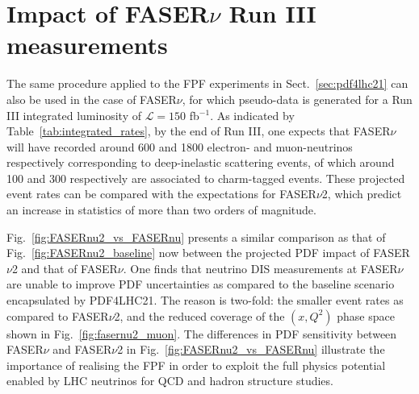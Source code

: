 \section{Impact of FASER$\nu$ Run III measurements}
\label{app:fasernu_runIII_impact}

The same procedure applied to the FPF experiments in Sect.~\ref{sec:pdf4lhc21}
can also be used in the case of FASER$\nu$, for which pseudo-data is generated
for a Run III integrated
luminosity of $\mathcal{L}=150$ fb$^{-1}$.
%
As indicated by Table~\ref{tab:integrated_rates}, by the end of Run III, one expects
that FASER$\nu$ will have recorded around 600 and 1800 electron- and muon-neutrinos
respectively corresponding to deep-inelastic scattering events, of which around 100
and 300 respectively are associated to charm-tagged events.
%
These projected event rates can be compared with the expectations for FASER$\nu$2, which predict
an increase in statistics of more than two orders of magnitude.

Fig.~\ref{fig:FASERnu2_vs_FASERnu} presents a similar comparison as that of
Fig.~\ref{fig:FASERnu2_baseline} now between the projected PDF impact of FASER$\nu$2 and that of
FASER$\nu$.
%
One finds that neutrino DIS measurements at FASER$\nu$ are unable to improve
PDF uncertainties as compared to the baseline scenario encapsulated by PDF4LHC21.
%
The reason is two-fold: the smaller event rates as compared to FASER$\nu$2,
and the reduced coverage of the $(x,Q^2)$ phase space shown in Fig.~\ref{fig:fasernu2_muon}.
%
The differences in PDF sensitivity between FASER$\nu$ and FASER$\nu$2 in
Fig.~\ref{fig:FASERnu2_vs_FASERnu} illustrate
the  importance of realising the FPF in order to exploit the full physics potential enabled 
by LHC neutrinos for QCD and hadron structure studies.

